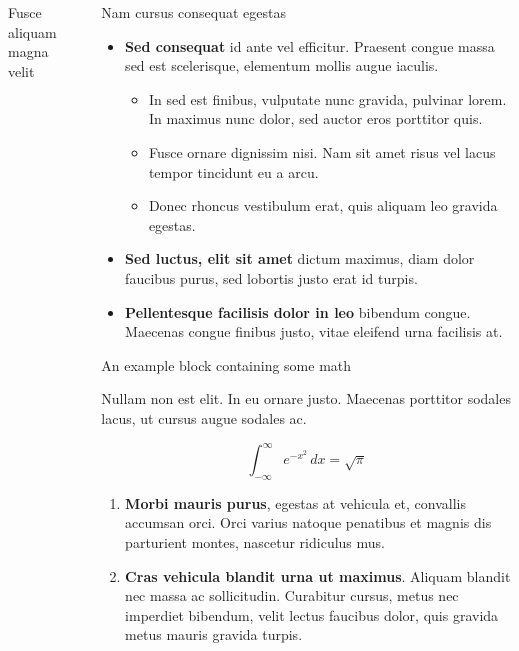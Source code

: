 \documentclass[final]{beamer}
\newlength{\sepwidth}
\newlength{\colwidth}
\newcommand{\separatorcolumn}{\begin{column}{\sepwidth}\end{column}}
\begin{document}
\begin{frame}[t]
\begin{columns}[t]
\begin{column}{\colwidth}
\begin{block}{Fusce aliquam magna velit}
			\end{block}
			
		\end{column}
	
		\separatorcolumn
		
		\begin{column}{\colwidth}
			
			\begin{block}{Nam cursus consequat egestas}
				
				\begin{itemize}
					\item \textbf{Sed consequat} id ante vel efficitur. Praesent congue massa
					sed est scelerisque, elementum mollis augue iaculis.
					\begin{itemize}
						\item In sed est finibus, vulputate
						nunc gravida, pulvinar lorem. In maximus nunc dolor, sed auctor eros
						porttitor quis.
						\item Fusce ornare dignissim nisi. Nam sit amet risus vel lacus
						tempor tincidunt eu a arcu.
						\item Donec rhoncus vestibulum erat, quis aliquam leo
						gravida egestas.
					\end{itemize}
					\item \textbf{Sed luctus, elit sit amet} dictum maximus, diam dolor
					faucibus purus, sed lobortis justo erat id turpis.
					\item \textbf{Pellentesque facilisis dolor in leo} bibendum congue.
					Maecenas congue finibus justo, vitae eleifend urna facilisis at.
				\end{itemize}
				
			\end{block}
			
			\begin{exampleblock}{An example block containing some math}{}
				
				Nullam non est elit. In eu ornare justo. Maecenas porttitor sodales lacus,
				ut cursus augue sodales ac.
				
				$$
				\int_{-\infty}^{\infty} e^{-x^2}\,dx = \sqrt{\pi}
				$$
				
				\begin{enumerate}
					\item \textbf{Morbi mauris purus}, egestas at vehicula et, convallis
					accumsan orci. Orci varius natoque penatibus et magnis dis parturient
					montes, nascetur ridiculus mus.
					\item \textbf{Cras vehicula blandit urna ut maximus}. Aliquam blandit nec
					massa ac sollicitudin. Curabitur cursus, metus nec imperdiet bibendum,
					velit lectus faucibus dolor, quis gravida metus mauris gravida turpis.
				\end{enumerate}
				

\end{exampleblock}
\end{column}
\end{columns}
\end{frame}
\end{document}
